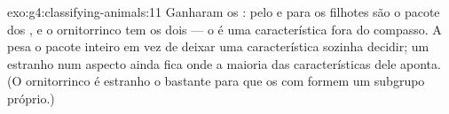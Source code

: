 \begin{solution}{exo:g4:classifying-animals:11}
Ganharam os : pelo e  para os filhotes são o pacote
dos , e o ornitorrinco tem os dois --- o  é uma
característica fora do compasso. A  pesa o pacote
inteiro em vez de deixar uma característica sozinha decidir; um
 estranho num aspecto ainda fica onde a maioria das
características dele aponta. (O ornitorrinco é estranho o bastante
para que os  com  formem um subgrupo próprio.)
\end{solution}
